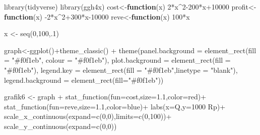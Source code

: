 \documentclass[
  letterpaper,
  DIV=11,
  numbers=noendperiod]{scrartcl}
\newenvironment{Shaded}{\begin{snugshade}}{\end{snugshade}}
\newcommand{\AttributeTok}[1]{\textcolor[rgb]{0.40,0.45,0.13}{#1}}
\newcommand{\ControlFlowTok}[1]{\textcolor[rgb]{0.00,0.23,0.31}{\textbf{#1}}}
\newcommand{\DecValTok}[1]{\textcolor[rgb]{0.68,0.00,0.00}{#1}}
\newcommand{\FloatTok}[1]{\textcolor[rgb]{0.68,0.00,0.00}{#1}}
\newcommand{\FunctionTok}[1]{\textcolor[rgb]{0.28,0.35,0.67}{#1}}
\newcommand{\NormalTok}[1]{\textcolor[rgb]{0.00,0.23,0.31}{#1}}
\newcommand{\OtherTok}[1]{\textcolor[rgb]{0.00,0.23,0.31}{#1}}
\newcommand{\SpecialCharTok}[1]{\textcolor[rgb]{0.37,0.37,0.37}{#1}}
\newcommand{\StringTok}[1]{\textcolor[rgb]{0.13,0.47,0.30}{#1}}
\begin{document}
\begin{Shaded}
\begin{Highlighting}[]
\FunctionTok{library}\NormalTok{(tidyverse)}
\FunctionTok{library}\NormalTok{(ggh4x)}
\NormalTok{cost}\OtherTok{\textless{}{-}}\ControlFlowTok{function}\NormalTok{(x) }\DecValTok{2}\SpecialCharTok{*}\NormalTok{x}\SpecialCharTok{\^{}}\DecValTok{2{-}200}\SpecialCharTok{*}\NormalTok{x}\SpecialCharTok{+}\DecValTok{10000}
\NormalTok{profit}\OtherTok{\textless{}{-}}\ControlFlowTok{function}\NormalTok{(x) }\SpecialCharTok{{-}}\DecValTok{2}\SpecialCharTok{*}\NormalTok{x}\SpecialCharTok{\^{}}\DecValTok{2}\SpecialCharTok{+}\DecValTok{300}\SpecialCharTok{*}\NormalTok{x}\DecValTok{{-}10000}
\NormalTok{reve}\OtherTok{\textless{}{-}}\ControlFlowTok{function}\NormalTok{(x) }\DecValTok{100}\SpecialCharTok{*}\NormalTok{x}

\NormalTok{x }\OtherTok{\textless{}{-}} \FunctionTok{seq}\NormalTok{(}\DecValTok{0}\NormalTok{,}\DecValTok{100}\NormalTok{,.}\DecValTok{1}\NormalTok{)}

\NormalTok{graph}\OtherTok{\textless{}{-}}\FunctionTok{ggplot}\NormalTok{()}\SpecialCharTok{+}\FunctionTok{theme\_classic}\NormalTok{() }\SpecialCharTok{+}
  \FunctionTok{theme}\NormalTok{(}\AttributeTok{panel.background =} \FunctionTok{element\_rect}\NormalTok{(}\AttributeTok{fill =} \StringTok{"\#f0f1eb"}\NormalTok{,}
                                        \AttributeTok{colour =} \StringTok{"\#f0f1eb"}\NormalTok{),}
        \AttributeTok{plot.background =} \FunctionTok{element\_rect}\NormalTok{(}\AttributeTok{fill =} \StringTok{"\#f0f1eb"}\NormalTok{),}
        \AttributeTok{legend.key =} \FunctionTok{element\_rect}\NormalTok{(}\AttributeTok{fill =} \StringTok{"\#f0f1eb"}\NormalTok{,}\AttributeTok{linetype =} \StringTok{"blank"}\NormalTok{),}
        \AttributeTok{legend.background =} \FunctionTok{element\_rect}\NormalTok{(}\AttributeTok{fill=}\StringTok{"\#f0f1eb"}\NormalTok{))}


\NormalTok{grafik6 }\OtherTok{\textless{}{-}}\NormalTok{ graph }\SpecialCharTok{+}
  \FunctionTok{stat\_function}\NormalTok{(}\AttributeTok{fun=}\NormalTok{cost,}\AttributeTok{size=}\FloatTok{1.1}\NormalTok{,}\AttributeTok{color=}\StringTok{\textquotesingle{}red\textquotesingle{}}\NormalTok{)}\SpecialCharTok{+}
  \FunctionTok{stat\_function}\NormalTok{(}\AttributeTok{fun=}\NormalTok{reve,}\AttributeTok{size=}\FloatTok{1.1}\NormalTok{,}\AttributeTok{color=}\StringTok{\textquotesingle{}blue\textquotesingle{}}\NormalTok{)}\SpecialCharTok{+}
  \FunctionTok{labs}\NormalTok{(}\AttributeTok{x=}\StringTok{\textquotesingle{}Q\textquotesingle{}}\NormalTok{,}\AttributeTok{y=}\StringTok{\textquotesingle{}1000 Rp\textquotesingle{}}\NormalTok{)}\SpecialCharTok{+}
  \FunctionTok{scale\_x\_continuous}\NormalTok{(}\AttributeTok{expand=}\FunctionTok{c}\NormalTok{(}\DecValTok{0}\NormalTok{,}\DecValTok{0}\NormalTok{),}\AttributeTok{limits=}\FunctionTok{c}\NormalTok{(}\DecValTok{0}\NormalTok{,}\DecValTok{100}\NormalTok{))}\SpecialCharTok{+}
  \FunctionTok{scale\_y\_continuous}\NormalTok{(}\AttributeTok{expand=}\FunctionTok{c}\NormalTok{(}\DecValTok{0}\NormalTok{,}\DecValTok{0}\NormalTok{))}


\end{Highlighting}
\end{Shaded}
\end{document}
